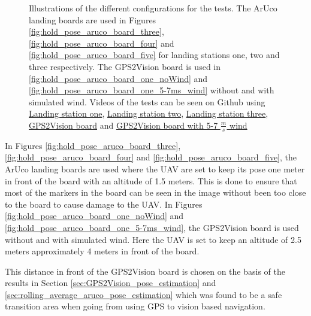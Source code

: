 \documentclass[../Head/report.tex]{subfiles}
\begin{document}
\begin{figure}[H]
    \caption{Illustrations of the different configurations for the tests. The ArUco landing boards are used in Figures \ref{fig:hold_pose_aruco_board_three}, \ref{fig:hold_pose_aruco_board_four} and \ref{fig:hold_pose_aruco_board_five} for landing stations one, two and three respectively. The GPS2Vision board is used in \ref{fig:hold_pose_aruco_board_one_noWind} and \ref{fig:hold_pose_aruco_board_one_5-7ms_wind} without and with simulated wind. Videos of the tests can be seen on Github using \href{https://github.com/Kenil16/master_project/tree/master/test_videos/analyse_hold_pose_using_aruco_pose_estimation_landing_station1}{Landing station one}, \href{https://github.com/Kenil16/master_project/tree/master/test_videos/analyse_hold_pose_using_aruco_pose_estimation_landing_station2}{Landing station two}, \href{https://github.com/Kenil16/master_project/tree/master/test_videos/analyse_hold_pose_using_aruco_pose_estimation_landing_station3}{Landing station three}, \href{https://github.com/Kenil16/master_project/tree/master/test_videos/analyse_hold_pose_using_aruco_pose_estimation_gps2vision_noWind}{GPS2Vision board} and  \href{https://github.com/Kenil16/master_project/tree/master/test_videos/analyse_hold_pose_using_aruco_pose_estimation_gps2vision_5-7ms_wind}{GPS2Vision board with 5-7 $\frac{m}{s}$ wind}}
    \label{fig:hold_pose_aruco_boards}
\end{figure}

In Figures \ref{fig:hold_pose_aruco_board_three}, \ref{fig:hold_pose_aruco_board_four} and \ref{fig:hold_pose_aruco_board_five}, the ArUco landing boards are used where the UAV are set to keep its pose one meter in front of the board with an altitude of 1.5 meters. This is done to ensure that most of the markers in the board can be seen in the image without been too close to the board to cause damage to the UAV. In Figures \ref{fig:hold_pose_aruco_board_one_noWind} and \ref{fig:hold_pose_aruco_board_one_5-7ms_wind}, the GPS2Vision board is used without and with simulated wind. Here the UAV is set to keep an altitude of 2.5 meters approximately 4 meters in front of the board.

This distance in front of the GPS2Vision board is chosen on the basis of the results in Section \ref{sec:GPS2Vision_pose_estimation} and \ref{sec:rolling_average_aruco_pose_estimation} which was found to be a safe transition area when going from using GPS to vision based navigation.   
\end{document}
